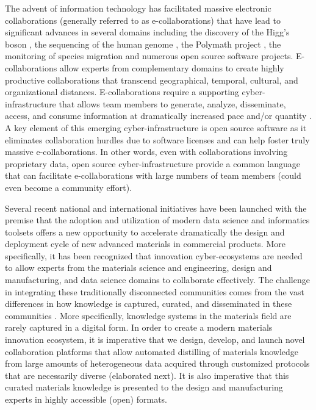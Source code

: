 \documentclass{bmcart}
\begin{document}
The advent of information technology has facilitated massive electronic collaborations (generally referred to as e-collaborations) that have lead to significant advances in several domains including the discovery of the Higg's boson \cite{aad2012observation}, the sequencing of the human genome \cite{lander2001initial}, the Polymath project \cite{cranshaw2011polymath}, the monitoring of species migration \cite{dickinson2010citizen, hochachka2012data} and numerous open source software projects. E-collaborations allow experts from complementary domains to create highly productive collaborations that transcend geographical, temporal, cultural, and organizational distances. E-collaborations require a supporting cyber-infrastructure that allows team members to generate, analyze, disseminate, access, and consume information at dramatically increased pace and/or quantity \cite{atkins2003revolutionizing}. A key element of this emerging cyber-infrastructure is open source software as it eliminates collaboration hurdles due to software licenses and can help foster truly massive e-collaborations. In other words, even with collaborations involving proprietary data, open source cyber-infrastructure provide a common language that can facilitate e-collaborations with large numbers of team members (could even become a community effort).

Several recent national and international initiatives \cite{anderson2011report, MGIwhite, MGI2014} have been launched with the premise that the adoption and utilization of modern data science and informatics toolsets offers a new opportunity to accelerate dramatically the design and deployment cycle of new advanced materials in commercial products. More specifically, it has been recognized that innovation cyber-ecosystems are needed to allow experts from the materials science and engineering, design and manufacturing, and data science domains to collaborate effectively. The challenge in integrating these traditionally disconnected communities comes from the vast differences in how knowledge is captured, curated, and disseminated in these communities \cite{kalidindi2015data}. More specifically, knowledge systems in the materials field are rarely captured in a digital form. In order to create a modern materials innovation ecosystem, it is imperative that we design, develop, and launch novel collaboration platforms that allow automated distilling of materials knowledge from large amounts of heterogeneous data acquired through customized protocols that are necessarily diverse (elaborated next). It is also imperative that this curated materials knowledge is presented to the design and manufacturing experts in highly accessible (open) formats.
\end{document}
